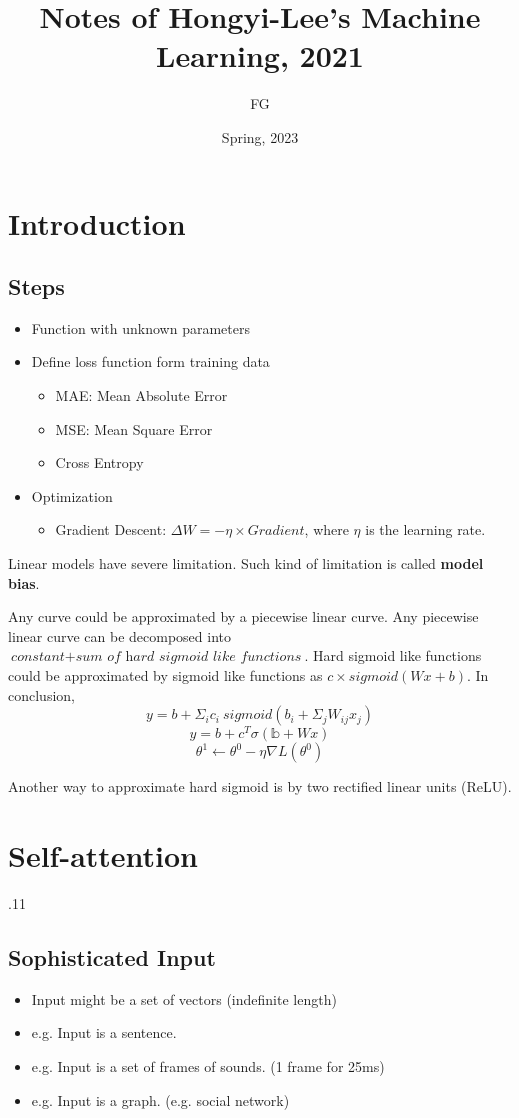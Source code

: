 \documentclass[11pt]{book}
\title{Notes of Hongyi-Lee's Machine Learning, 2021}
\author{FG}
\date{Spring, 2023}
\begin{document}
\maketitle
\tableofcontents
\chapter{Introduction}
\section{Steps}
\begin{itemize}
    \item Function with unknown parameters
    \item Define loss function form training data
    \begin{itemize}
        \item MAE: Mean Absolute Error
        \item MSE: Mean Square Error
        \item Cross Entropy
    \end{itemize}
    \item Optimization
    \begin{itemize}
        \item Gradient Descent: $\Delta  W=-\eta\times Gradient$, where $\eta$ is the learning rate.
    \end{itemize}
\end{itemize}

Linear models have severe limitation. Such kind of limitation is called \textbf{model bias}.

Any curve could be approximated by a piecewise linear curve. Any piecewise linear curve can be decomposed into $\textit{constant} + \textit{sum of hard sigmoid like functions}$. Hard sigmoid like functions could be approximated by sigmoid like functions as $c \times sigmoid(Wx+b)$. In conclusion,
$$ y = b + \Sigma_i c_i\ sigmoid(b_i + \Sigma_j W_{ij} x_j) $$
$$ y = b + c^{T} \sigma(\mathbb{b} + Wx) $$
$$ \theta^1 \leftarrow \theta^0 - \eta \nabla L(\theta^0) $$

Another way to approximate hard sigmoid is by two rectified linear units (ReLU).

\chapter{Self-attention}
.11
\section{Sophisticated Input}
\begin{itemize}
    \item Input might be a set of vectors (indefinite length)
    \item e.g. Input is a sentence.
    \item e.g. Input is a set of frames of sounds. (1 frame for 25ms)
    \item e.g. Input is a graph. (e.g. social network)
\end{itemize}
\end{document}
